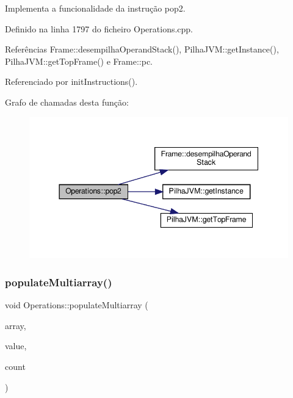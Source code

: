 Implementa a funcionalidade da instrução pop2. 



Definido na linha 1797 do ficheiro Operations.\+cpp.



Referências Frame\+::desempilha\+Operand\+Stack(), Pilha\+J\+V\+M\+::get\+Instance(), Pilha\+J\+V\+M\+::get\+Top\+Frame() e Frame\+::pc.



Referenciado por init\+Instructions().

Grafo de chamadas desta função\+:
\nopagebreak
\begin{figure}[H]
\begin{center}
\leavevmode
\includegraphics[width=344pt]{classOperations_a54e578f7f27df39f8c516ec93195e219_cgraph}
\end{center}
\end{figure}
\mbox{\label{classOperations_af5306e6b717783a9752af2bbc922e36b}} 
\subsubsection{\texorpdfstring{populate\+Multiarray()}{populateMultiarray()}}
{\footnotesize\ttfamily void Operations\+::populate\+Multiarray (\begin{DoxyParamCaption}\item[{\hyperlink{classArrayObject}{Array\+Object} $\ast$}]{array,  }\item[{\hyperlink{BasicTypes_8h_ad9971b6ef33e02ba2c75d19c1d2518a1}{Value\+Type}}]{value,  }\item[{stack$<$ int $>$}]{count }\end{DoxyParamCaption})}



